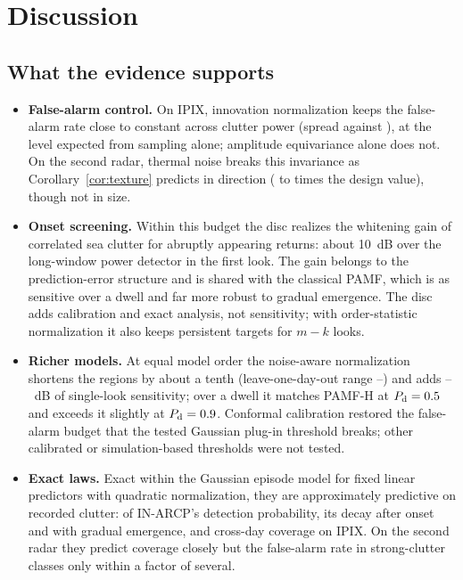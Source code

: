\documentclass[journal]{IEEEtran}
\begin{document}
\section{Discussion}
\subsection{What the evidence supports}
\begin{itemize}[leftmargin=*,itemsep=1pt]
\item \textbf{False-alarm control.} On IPIX, innovation normalization keeps the false-alarm rate close to constant across clutter power (spread \QPfaINSpread{} against \QPfaUSpread), at the level expected from sampling alone; amplitude equivariance alone does not. On the second radar, thermal noise breaks this invariance as Corollary~\ref{cor:texture} predicts in direction (\JPfaRatioLow{} to \JPfaRatioHigh{} times the design value), though not in size.
\item \textbf{Onset screening.} Within this budget the disc realizes the whitening gain of correlated sea clutter for abruptly appearing returns: about 10~dB over the long-window power detector in the first look. The gain belongs to the prediction-error structure and is shared with the classical PAMF, which is as sensitive over a dwell and far more robust to gradual emergence. The disc adds calibration and exact analysis, not sensitivity; with order-statistic normalization it also keeps persistent targets for $m-k$ looks.
\item \textbf{Richer models.} At equal model order the noise-aware normalization shortens the regions by about a tenth (leave-one-day-out range \LodoSameLo--\LodoSameHi) and adds \NAvsINFourHalf--\NAvsINFourNinety~dB of single-look sensitivity; over a dwell it matches PAMF-H at $P_{\rm d}=0.5$ and exceeds it slightly at $P_{\rm d}=0.9$. Conformal calibration restored the false-alarm budget that the tested Gaussian plug-in threshold breaks; other calibrated or simulation-based thresholds were not tested.
\item \textbf{Exact laws.} Exact within the Gaussian episode model for fixed linear predictors with quadratic normalization, they are approximately predictive on recorded clutter: of IN-ARCP's detection probability, its decay after onset and with gradual emergence, and cross-day coverage on IPIX. On the second radar they predict coverage closely but the false-alarm rate in strong-clutter classes only within a factor of several.
\end{itemize}
\end{document}
